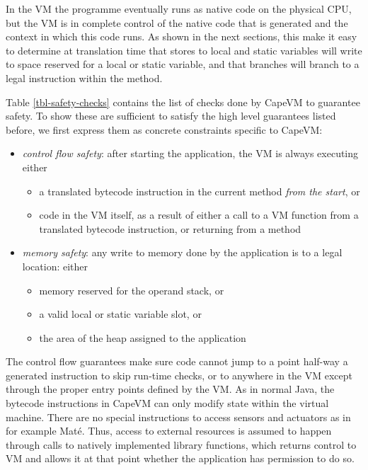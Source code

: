 In the VM the programme eventually runs as native code on the physical CPU, but the VM is in complete control of the native code that is generated and the context in which this code runs. As shown in the next sections, this make it easy to determine at translation time that stores to local and static variables will write to space reserved for a local or static variable, and that branches will branch to a legal instruction within the method.

Table \ref{tbl-safety-checks} contains the list of checks done by CapeVM to guarantee safety. To show these are sufficient to satisfy the high level guarantees listed before, we first express them as concrete constraints specific to CapeVM:

\begin{itemize}
    \item \emph{control flow safety}: after starting the application, the VM is always executing either
        \begin{itemize}
            \item a translated bytecode instruction in the current method \emph{from the start}, or
            \item code in the VM itself, as a result of either a call to a VM function from a translated bytecode instruction, or returning from a method
        \end{itemize}
    \item \emph{memory safety}: any write to memory done by the application is to a legal location: either
        \begin{itemize}
            \item memory reserved for the operand stack, or
            \item a valid local or static variable slot, or
            \item the area of the heap assigned to the application
        \end{itemize}
\end{itemize}

The control flow guarantees make sure code cannot jump to a point half-way a generated instruction to skip run-time checks, or to anywhere in the VM except through the proper entry points defined by the VM. As in normal Java, the bytecode instructions in CapeVM can only modify state within the virtual machine. There are no special instructions to access sensors and actuators as in for example Maté. Thus, access to external resources is assumed to happen through calls to natively implemented library functions, which returns control to VM and allows it at that point whether the application has permission to do so.

